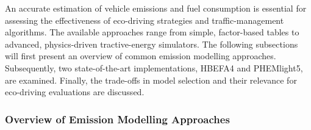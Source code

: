 An accurate estimation of vehicle emissions and fuel consumption is essential for assessing the effectiveness of eco-driving strategies and traffic-management algorithms. The available approaches range from simple, factor-based tables to advanced, physics-driven tractive-energy simulators. The following subsections will first present an overview of common emission modelling approaches. Subsequently, two state-of-the-art implementations, HBEFA4 and PHEMlight5, are examined. Finally, the trade-offs in model selection and their relevance for eco-driving evaluations are discussed.

\subsubsection{Overview of Emission Modelling Approaches}
\label{subsubsec:overview_emission_models}

